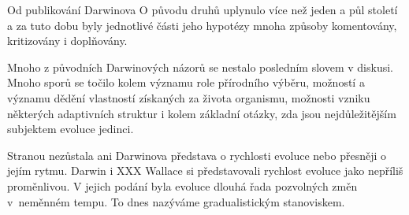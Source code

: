 Od publikování Darwinova O původu druhů uplynulo více než jeden a půl století a za tuto dobu byly jednotlivé části
jeho hypotézy mnoha způsoby komentovány, kritizovány i doplňovány.

Mnoho z původních Darwinových názorů se nestalo posledním slovem v diskusi. Mnoho sporů se točilo kolem významu role
přírodního výběru, možností a významu dědění vlastností získaných za života organismu, možnosti vzniku některých
adaptivních struktur i kolem základní otázky, zda jsou nejdůležitějším subjektem evoluce jedinci.

Stranou nezůstala ani Darwinova představa o rychlosti evoluce nebo přesněji o jejím rytmu. Darwin i XXX Wallace si
představovali rychlost evoluce jako nepříliš proměnlivou. V jejich podání byla evoluce dlouhá řada pozvolných změn
v~neměnném tempu. To dnes nazýváme gradualistickým stanoviskem.
